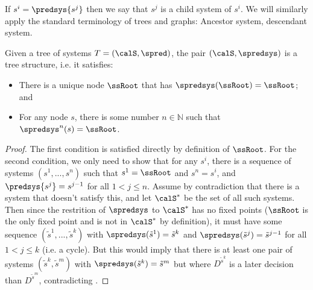 \begin{terminology*}
If $s^i=\predsys{s^j}$ then we say that $s^j$ is a child system of $s^i$. 
We will similarly apply the standard terminology of trees and graphs: Ancestor system, descendant system.
\end{terminology*}









\begin{lemma}  \label{le:21Jan21.1-tree-of-systems-has-tree-structure}
Given a tree of systems $T=(\calS, \spred)$, the pair $(\calS,\spredsys)$ is a tree structure, i.e. it satisfies:
\begin{itemize}
    \item There is a unique node $\ssRoot$ that has $\spredsys(\ssRoot)=\ssRoot$; and
    
    \item For any node $s$, there is some number $n\in \mathbb{N}$ such that $\spredsys^n(s)=\ssRoot$.
\end{itemize}
\end{lemma}

\begin{proof}
The first condition is satisfied directly by definition of $\ssRoot$. For the second condition, we only need to show that for any $s^i$, there is a sequence of systems $(s^1,...,s^n)$ such that $s^1=\ssRoot$ and $s^n=s^i$, and $\predsys{s^j}=s^{j-1}$ for all $1<j\leq n$. Assume by contradiction that there is a system that doesn't satisfy this, and let $\calS^*$ be the set of all such systems. Then since the restrition of $\spredsys$ to $\calS^*$ has no fixed points ($\ssRoot$ is the only fixed point and is not in $\calS^*$ by definition), it must have some sequence $(\tilde s^1,...,\tilde s^k)$ with $\spredsys(\tilde s^1)=\tilde s^k$ and $\spredsys(\tilde s^j)=\tilde s^{j-1}$ for all $1<j\leq k$ (i.e. a cycle). But this would imply that there is at least one pair of systems $(\tilde s^k,\tilde s^{m})$ with $\spredsys(\tilde s^k)=\tilde s^m$ but where $D^{\tilde s^k}$ is a later decision than $D^{\tilde s^m}$, contradicting .
\end{proof}














